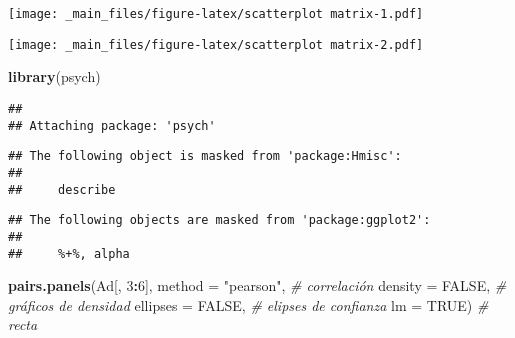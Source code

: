 \documentclass[
]{book}
\newenvironment{Shaded}{\begin{snugshade}}{\end{snugshade}}
\newcommand{\CommentTok}[1]{\textcolor[rgb]{0.56,0.35,0.01}{\textit{#1}}}
\newcommand{\DataTypeTok}[1]{\textcolor[rgb]{0.13,0.29,0.53}{#1}}
\newcommand{\DecValTok}[1]{\textcolor[rgb]{0.00,0.00,0.81}{#1}}
\newcommand{\KeywordTok}[1]{\textcolor[rgb]{0.13,0.29,0.53}{\textbf{#1}}}
\newcommand{\NormalTok}[1]{#1}
\newcommand{\OperatorTok}[1]{\textcolor[rgb]{0.81,0.36,0.00}{\textbf{#1}}}
\newcommand{\OtherTok}[1]{\textcolor[rgb]{0.56,0.35,0.01}{#1}}
\newcommand{\StringTok}[1]{\textcolor[rgb]{0.31,0.60,0.02}{#1}}
\begin{document}
\texttt{[image: \_main\_files/figure-latex/scatterplot matrix-1.pdf]}

\begin{Shaded}
\end{Shaded}

\texttt{[image: \_main\_files/figure-latex/scatterplot matrix-2.pdf]}

\begin{Shaded}
\begin{Highlighting}[]
\KeywordTok{library}\NormalTok{(psych)}
\end{Highlighting}
\end{Shaded}

\begin{verbatim}
## 
## Attaching package: 'psych'
\end{verbatim}

\begin{verbatim}
## The following object is masked from 'package:Hmisc':
## 
##     describe
\end{verbatim}

\begin{verbatim}
## The following objects are masked from 'package:ggplot2':
## 
##     %+%, alpha
\end{verbatim}

\begin{Shaded}
\begin{Highlighting}[]
\KeywordTok{pairs.panels}\NormalTok{(Ad[, }\DecValTok{3}\OperatorTok{:}\DecValTok{6}\NormalTok{], }
             \DataTypeTok{method =} \StringTok{"pearson"}\NormalTok{, }\CommentTok{# correlación}
             \DataTypeTok{density =} \OtherTok{FALSE}\NormalTok{,  }\CommentTok{# gráficos de densidad}
             \DataTypeTok{ellipses =} \OtherTok{FALSE}\NormalTok{, }\CommentTok{# elipses de confianza}
             \DataTypeTok{lm =} \OtherTok{TRUE}\NormalTok{) }\CommentTok{# recta}
\end{Highlighting}
\end{Shaded}
\end{document}
